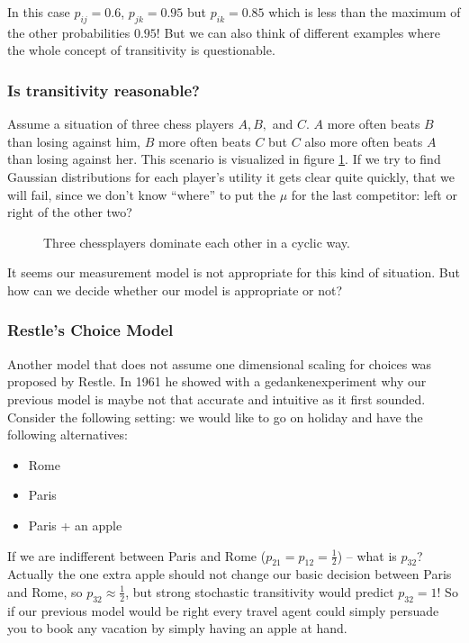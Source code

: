 \documentclass[../main/Notes.tex]{subfiles}
\begin{document}
In this case $p_{ij} = 0.6$, $p_{jk}=0.95$ but $p_{ik} = 0.85$ which is less than the maximum of the other probabilities $0.95$! But we can also think of different examples where the whole concept of transitivity is questionable.

\subsubsection{Is transitivity reasonable?}
Assume a situation of three chess players $A, B,$ and $C$. $A$ more often beats $B$ than losing against him, $B$ more often beats $C$ but $C$ also more often beats $A$ than losing against her. This scenario is visualized in figure \ref{fig:2014-07-04-chesscycle}. If we try to find Gaussian distributions for each player's utility it gets clear quite quickly, that we will fail, since we don't know ``where'' to put the $\mu$ for the last competitor: left or right of the other two?

\begin{figure}[ht]
  \centering
  \caption{Three chessplayers dominate each other in a cyclic way.}
  \label{fig:2014-07-04-chesscycle}
\end{figure}

It seems our measurement model is not appropriate for this kind of situation. But how can we decide whether our model is appropriate or not?

\subsubsection{Restle's Choice Model}
Another model that does not assume one dimensional scaling for choices was proposed by Restle. In 1961 he showed with a gedankenexperiment why our previous model is maybe not that accurate and intuitive as it first sounded. Consider the following setting: we would like to go on holiday and have the following alternatives:
\begin{itemize}
  \item Rome
	\item Paris
  \item Paris + an apple
\end{itemize}
If we are indifferent between Paris and Rome ($p_{21} = p_{12} = \frac{1}{2}$) -- what is $p_{32}$? Actually the one extra apple should not change our basic decision between Paris and Rome, so $p_{32} \approx \frac{1}{2}$, but strong stochastic transitivity would predict $p_{32} = 1$! So if our previous model would be right every travel agent could simply persuade you to book any vacation by simply having an apple at hand.
\end{document}
